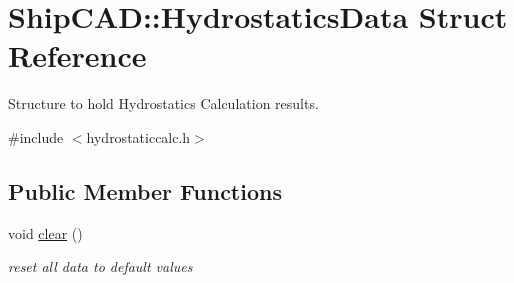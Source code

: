 \hypertarget{structShipCAD_1_1HydrostaticsData}{\section{Ship\-C\-A\-D\-:\-:Hydrostatics\-Data Struct Reference}
\label{structShipCAD_1_1HydrostaticsData}
}


Structure to hold Hydrostatics Calculation results.  




{\ttfamily \#include $<$hydrostaticcalc.\-h$>$}

\subsection*{Public Member Functions}
\begin{DoxyCompactItemize}
\item 
void \hyperlink{structShipCAD_1_1HydrostaticsData_a7ea81ac589a3b24424b4176c734c7a37}{clear} ()
\begin{DoxyCompactList}\small\item\em reset all data to default values \end{DoxyCompactList}\end{DoxyCompactItemize}
